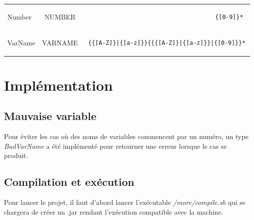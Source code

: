 \documentclass[pdftex,10pt,a4paper]{article}
\begin{document}
\begin{tabular}{|l|c|r|}
  Number & NUMBER & \begin{minipage}{2in} \begin{verbatim} {[0-9]}* \end{verbatim} \end{minipage} \\
  VarName & VARNAME & \begin{minipage}{2in} \begin{verbatim} {{[A-Z]}|{[a-z]}}{{{[A-Z]}|{[a-z]}}|{[0-9]}}* \end{verbatim} \end{minipage} \\


\hline
\end{tabular}

\section{Implémentation}

\subsection{Mauvaise variable}
Pour éviter les cas où des noms de variables commencent par un numéro, un type \textit{BadVarName} a été implémenté pour retourner une erreur lorsque le cas se produit. 

\subsection{Compilation et exécution}
Pour lancer le projet, il faut d'abord lancer l'exécutable \textit{/more/compile.sh} qui se chargera de créer un .jar rendant l'exécution compatible avec la machine. 
\end{document}

